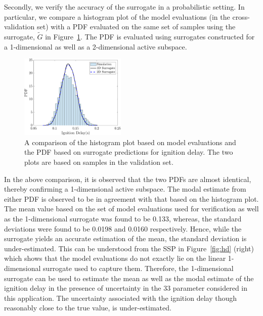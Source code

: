 Secondly, we verify the accuracy of the surrogate in a probabilistic setting. In particular, we compare a histogram
plot of the model evaluations (in the cross-validation set) with a PDF evaluated on the same set of samples
using the surrogate, $\tilde{G}$ in Figure~\ref{fig:pdf_33D}. The PDF is evaluated using surrogates constructed for
a 1-dimensional as well as a 2-dimensional active subspace. 
%
\begin{figure}[htbp]
 \begin{center}
  \includegraphics[width=0.45\textwidth]{./Figures/pdf_comp_id_1e4}
\caption{A comparison of the histogram plot based on model evaluations and the PDF based on surrogate
predictions for ignition delay. The two plots are based on samples in the validation set.}
\label{fig:pdf_33D}
\end{center}
\end{figure}
%
In the above comparison, it is observed that the two PDFs are almost identical, thereby confirming a 1-dimensional
active subspace. The modal estimate from either PDF is observed to be in agreement with that
based on the histogram plot. The mean value based on the set of model evaluations used for verification as well
as the 1-dimensional surrogate was found to be 0.133, whereas, the standard deviations were found to be 0.0198 and 0.0160
respectively. Hence, while the surrogate yields an accurate estimation of the mean, the standard deviation is
under-estimated. This can be understood from the SSP in Figure~\ref{fig:hd} (right) which shows that the model
evaluations do not exactly lie on the linear 1-dimensional surrogate used to capture them. Therefore, the
1-dimensional surrogate can be used to estimate the mean as well as the modal estimate of the ignition delay in
the presence of uncertainty in the 33 parameter considered in this application. The uncertainty associated with the
ignition delay though reasonably close to the true value, is under-estimated.
 
































